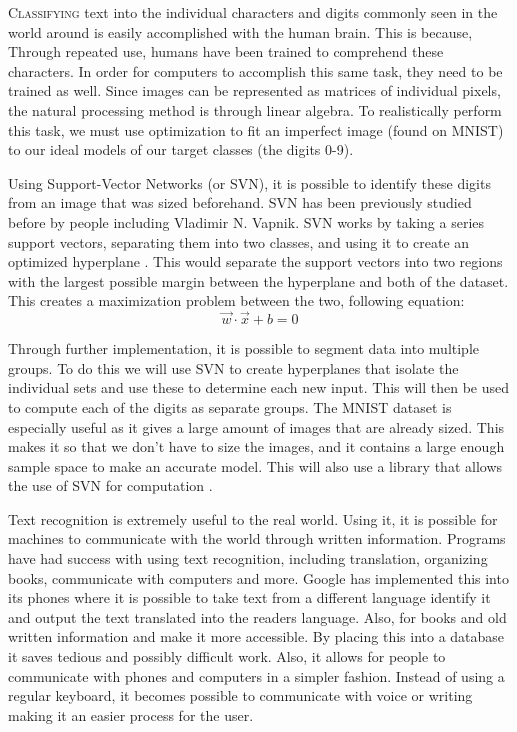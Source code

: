 \lettrine[nindent=0em,lines=3]{C}{lassifying} text into the individual characters and digits commonly seen in the world around is easily accomplished with the human brain. This is because, Through repeated use, humans have been trained to comprehend these characters. In order for computers to accomplish this same task, they need to be trained as well. Since images can be represented as matrices of individual pixels, the natural processing method is through linear algebra. To realistically perform this task, we must use optimization to fit an imperfect image (found on MNIST) to our ideal models of our target classes (the digits 0-9).

Using Support-Vector Networks (or SVN), it is possible to identify these digits from an image that was sized beforehand. SVN has been previously studied before by people including Vladimir N. Vapnik. SVN works by taking a series support vectors, separating them into two classes, and using it to create an optimized hyperplane \cite{statistical-learning}. This would separate the support vectors into two regions with the largest possible margin between the hyperplane and both of the dataset. This creates a maximization problem between the two, following equation:
\begin{equation}
  \vec{w} \cdot \vec{x}+b=0
\end{equation}

Through further implementation, it is possible to segment data into multiple groups. To do this we will use SVN to create hyperplanes that isolate the individual sets and use these to determine each new input. This will then be used to compute each of the digits as separate groups.  The MNIST dataset is especially useful as it gives a large amount of images that are already sized. This makes it so that we don't have to size the images, and it contains a large enough sample space to make an accurate model. This will also use a library that allows the use of SVN for computation \cite{scikit-learn}.

Text recognition is extremely useful to the real world. Using it, it is possible for machines to communicate with the world through written information. Programs have had success with using text recognition, including translation, organizing books, communicate with computers and more. Google has implemented this into its phones where it is possible to take text from a different language identify it and output the text translated into the readers language. Also, for books and old written information and make it more accessible. By placing this into a database it saves tedious and possibly difficult work. Also, it allows for people to communicate with phones and computers in a simpler fashion. Instead of using a regular keyboard, it becomes possible to communicate with voice or writing making it an easier process for the user.